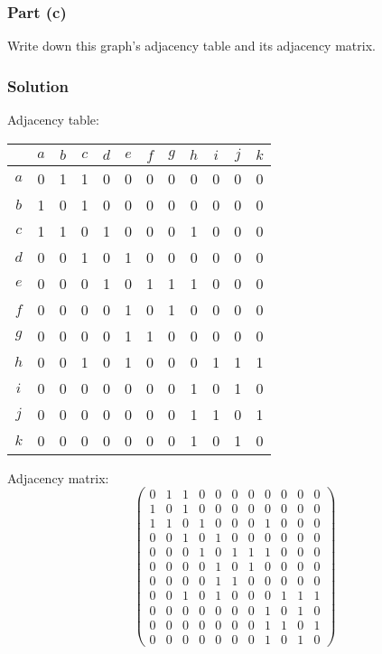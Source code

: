 \documentclass[12pt]{article}
\begin{document}
\pagebreak
\subsubsection*{Part (c)}

Write down this graph's adjacency table and its adjacency matrix.

\subsubsection*{Solution}

Adjacency table:

\begin{tabular}{c | *{11}{c}}
	& $a$ & $b$ & $c$ & $d$ & $e$ & $f$ & $g$ & $h$ & $i$ & $j$ & $k$ \\
	\hline
	$a$ & 0 & 1 & 1 & 0 & 0 & 0 & 0 & 0 & 0 & 0 & 0 \\
	$b$ & 1 & 0 & 1 & 0 & 0 & 0 & 0 & 0 & 0 & 0 & 0 \\
	$c$ & 1 & 1 & 0 & 1 & 0 & 0 & 0 & 1 & 0 & 0 & 0 \\
	$d$ & 0 & 0 & 1 & 0 & 1 & 0 & 0 & 0 & 0 & 0 & 0 \\
	$e$ & 0 & 0 & 0 & 1 & 0 & 1 & 1 & 1 & 0 & 0 & 0 \\
	$f$ & 0 & 0 & 0 & 0 & 1 & 0 & 1 & 0 & 0 & 0 & 0 \\
	$g$ & 0 & 0 & 0 & 0 & 1 & 1 & 0 & 0 & 0 & 0 & 0 \\
	$h$ & 0 & 0 & 1 & 0 & 1 & 0 & 0 & 0 & 1 & 1 & 1 \\
	$i$ & 0 & 0 & 0 & 0 & 0 & 0 & 0 & 1 & 0 & 1 & 0 \\
	$j$ & 0 & 0 & 0 & 0 & 0 & 0 & 0 & 1 & 1 & 0 & 1 \\
	$k$ & 0 & 0 & 0 & 0 & 0 & 0 & 0 & 1 & 0 & 1 & 0
\end{tabular}

\bigskip
Adjacency matrix:
\[
\begin{pmatrix}
	0 & 1 & 1 & 0 & 0 & 0 & 0 & 0 & 0 & 0 & 0 \\
	1 & 0 & 1 & 0 & 0 & 0 & 0 & 0 & 0 & 0 & 0 \\
	1 & 1 & 0 & 1 & 0 & 0 & 0 & 1 & 0 & 0 & 0 \\
	0 & 0 & 1 & 0 & 1 & 0 & 0 & 0 & 0 & 0 & 0 \\
	0 & 0 & 0 & 1 & 0 & 1 & 1 & 1 & 0 & 0 & 0 \\
	0 & 0 & 0 & 0 & 1 & 0 & 1 & 0 & 0 & 0 & 0 \\
	0 & 0 & 0 & 0 & 1 & 1 & 0 & 0 & 0 & 0 & 0 \\
	0 & 0 & 1 & 0 & 1 & 0 & 0 & 0 & 1 & 1 & 1 \\
	0 & 0 & 0 & 0 & 0 & 0 & 0 & 1 & 0 & 1 & 0 \\
	0 & 0 & 0 & 0 & 0 & 0 & 0 & 1 & 1 & 0 & 1 \\
	0 & 0 & 0 & 0 & 0 & 0 & 0 & 1 & 0 & 1 & 0
\end{pmatrix}
\]
\end{document}
